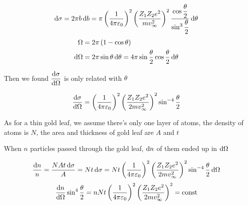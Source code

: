 \begin{equation*}
  \begin{aligned}
    \mathop{}\!\mathrm{d} \sigma = 2 \pi b \mathop{}\!\mathrm{d} b = \pi \left( \dfrac{1}{4 \pi \varepsilon_0}  \right)^2 \left( \dfrac{Z_1 Z_2 e^2}{m v_{\infty}^2}  \right)^2 \dfrac{\cos \dfrac{\theta}{2} }{\sin^3 \dfrac{\theta}{2} } \mathop{}\!\mathrm{d} \theta 
  \end{aligned}
\end{equation*}
\begin{equation*}
  \begin{aligned}
    \Omega &= 2 \pi \left( 1 - \cos \theta \right) \\
    \mathop{}\!\mathrm{d} \Omega &= 2 \pi \sin \theta \mathop{}\!\mathrm{d} \theta = 4 \pi \sin \dfrac{\theta}{2} \cos \dfrac{\theta}{2} \mathop{}\!\mathrm{d} \theta  
  \end{aligned}
\end{equation*}

Then we found $\dfrac{\mathop{}\!\mathrm{d} \sigma}{\mathop{}\!\mathrm{d} \Omega}$ is only related with $\theta$

\begin{equation*}
  \begin{aligned}
    \dfrac{\mathop{}\!\mathrm{d} \sigma}{\mathop{}\!\mathrm{d} \Omega} = \left( \dfrac{1}{4 \pi \varepsilon_0}  \right)^2 \left( \dfrac{Z_1 Z_2 e^2}{2 m v_{\infty}^2}  \right)^2 \sin^{-4} \dfrac{\theta}{2}
  \end{aligned}
\end{equation*}

As for a thin gold leaf, we assume there's only one layer of atoms, the density of atoms is $N$, the area and thickness of gold leaf are $A$ and $t$

When $n$ particles passed through the gold leaf, $\mathop{}\!\mathrm{d} n$ of them ended up in $\mathop{}\!\mathrm{d} \Omega$

\begin{equation*}
  \begin{aligned}
    \dfrac{\mathop{}\!\mathrm{d} n}{n} = \dfrac{N A t \mathop{}\!\mathrm{d} \sigma}{A} = N t \mathop{}\!\mathrm{d} \sigma = N t \left( \dfrac{1}{4 \pi \varepsilon_0}  \right)^2 \left( \dfrac{Z_1 Z_2 e^2}{2 m v_{\infty}^2}  \right)^2 \sin^{-4} \dfrac{\theta}{2} \mathop{}\!\mathrm{d} \Omega 
  \end{aligned}
\end{equation*}
\begin{equation*}
  \begin{aligned}
    \dfrac{\mathop{}\!\mathrm{d} n}{\mathop{}\!\mathrm{d} \Omega} \sin^4 \dfrac{\theta}{2} = n N t \left( \dfrac{1}{4 \pi \varepsilon_0}  \right)^2 \left( \dfrac{Z_1 Z_2 e^2}{2 m v_{\infty}^2}  \right)^2 = \mathrm{const}
  \end{aligned}
\end{equation*}

